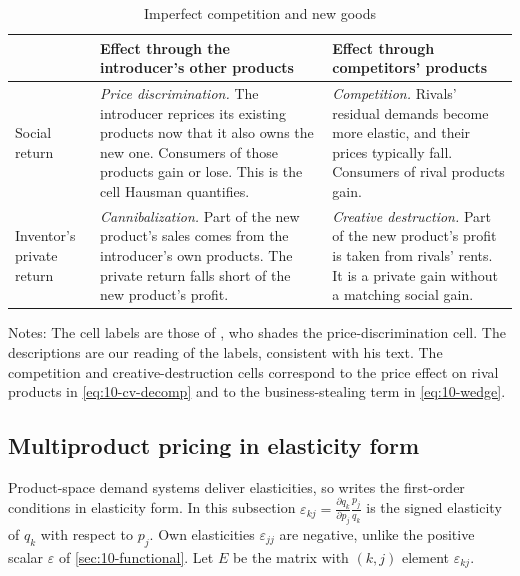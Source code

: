 \begin{table}[htbp]
\centering
\caption{Imperfect competition and new goods}\label{tab:10-bresnahan-2x2}
\begin{threeparttable}
\begin{tabularx}{\textwidth}{@{}>{\raggedright\arraybackslash}p{2.3cm}>{\raggedright\arraybackslash}X>{\raggedright\arraybackslash}X@{}}
\toprule
 & Effect through the introducer's other products & Effect through competitors' products \\
\midrule
Social return & \textit{Price discrimination.} The introducer reprices its existing products now that it also
owns the new one. Consumers of those products gain or lose. This is the cell Hausman quantifies. &
\textit{Competition.} Rivals' residual demands become more elastic, and their prices typically fall.
Consumers of rival products gain. \\
\addlinespace
Inventor's private return & \textit{Cannibalization.} Part of the new product's sales comes from the
introducer's own products. The private return falls short of the new product's profit. &
\textit{Creative destruction.} Part of the new product's profit is taken from rivals' rents. It is a private
gain without a matching social gain. \\
\bottomrule
\end{tabularx}
\begin{tablenotes}[flushleft]\footnotesize
\item Notes: The cell labels are those of \citet[Figure 5C.2]{Bresnahan1997}, who shades the price-discrimination
cell. The descriptions are our reading of the labels, consistent with his text. The competition and
creative-destruction cells correspond to the price effect on rival products in \eqref{eq:10-cv-decomp} and to
the business-stealing term in \eqref{eq:10-wedge}.
\end{tablenotes}
\end{threeparttable}
\end{table}

\subsection{Multiproduct pricing in elasticity form}\label{sec:10-multiproduct}

Product-space demand systems deliver elasticities, so \citet{Hausman1997} writes the first-order conditions in
elasticity form. In this subsection $\varepsilon_{kj} = \frac{\partial q_k}{\partial p_j}\frac{p_j}{q_k}$ is
the signed elasticity of $q_k$ with respect to $p_j$. Own elasticities $\varepsilon_{jj}$ are negative, unlike
the positive scalar $\varepsilon$ of \cref{sec:10-functional}. Let $E$ be the matrix with $(k,j)$ element
$\varepsilon_{kj}$.

